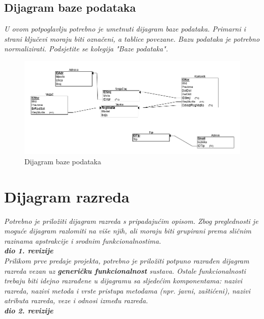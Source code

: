 			\subsection{Dijagram baze podataka}
				\textit{ U ovom potpoglavlju potrebno je umetnuti dijagram baze podataka. Primarni i strani ključevi moraju biti označeni, a tablice povezane. Bazu podataka je potrebno normalizirati. Podsjetite se kolegija "Baze podataka".}
			
			\eject
			\begin{figure}[H]
				\includegraphics[width=\linewidth]{slike/DentAll_RelacijskiDijagramBaze.png}
				\centering
				\caption{Dijagram baze podataka}
				\label{fig:dijagramBaze}
			\end{figure}
			
			
		\section{Dijagram razreda}
		
			\textit{Potrebno je priložiti dijagram razreda s pripadajućim opisom. Zbog preglednosti je moguće dijagram razlomiti na više njih, ali moraju biti grupirani prema sličnim razinama apstrakcije i srodnim funkcionalnostima.}\\
			
			\textbf{\textit{dio 1. revizije}}\\
			
			\textit{Prilikom prve predaje projekta, potrebno je priložiti potpuno razrađen dijagram razreda vezan uz \textbf{generičku funkcionalnost} sustava. Ostale funkcionalnosti trebaju biti idejno razrađene u dijagramu sa sljedećim komponentama: nazivi razreda, nazivi metoda i vrste pristupa metodama (npr. javni, zaštićeni), nazivi atributa razreda, veze i odnosi između razreda.}\\
			
			\textbf{\textit{dio 2. revizije}}\\			
			

